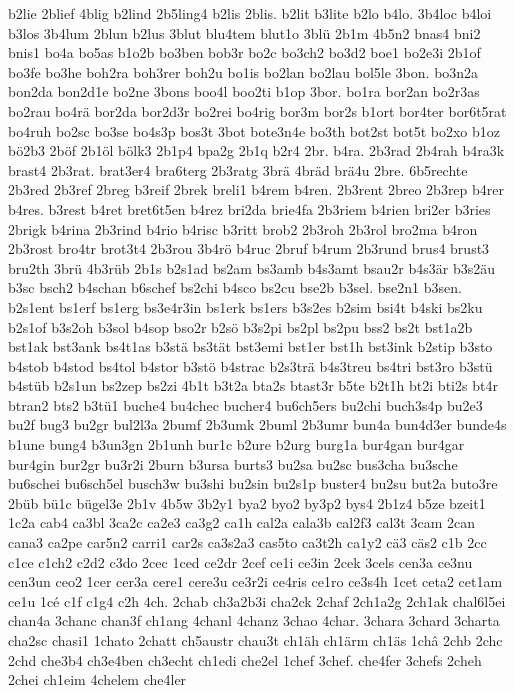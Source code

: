 {b2lie
2blief
4blig
b2lind
2b5ling4
b2lis
2blis.
b2lit
b3lite
b2lo
b4lo.
3b4loc
b4loi
b3los
3b4lum
2blun
b2lus
3blut
blu4tem
blut1o
3blü
2b1m
4b5n2
bnas4
bni2
bnis1
bo4a
bo5as
b1o2b
bo3ben
bob3r
bo2c
bo3ch2
bo3d2
boe1
bo2e3i
2b1of
bo3fe
bo3he
boh2ra
boh3rer
boh2u
bo1is
bo2lan
bo2lau
bol5le
3bon.
bo3n2a
bon2da
bon2d1e
bo2ne
3bons
boo4l
boo2ti
b1op
3bor.
bo1ra
bor2an
bo2r3as
bo2rau
bo4rä
bor2da
bor2d3r
bo2rei
bo4rig
bor3m
bor2s
b1ort
bor4ter
bor6t5rat
bo4ruh
bo2sc
bo3se
bo4s3p
bos3t
3bot
bote3n4e
bo3th
bot2st
bot5t
bo2xo
b1oz
bö2b3
2böf
2b1öl
bölk3
2b1p4
bpa2g
2b1q
b2r4
2br.
b4ra.
2b3rad
2b4rah
b4ra3k
brast4
2b3rat.
brat3er4
bra6terg
2b3ratg
3brä
4bräd
brä4u
2bre.
6b5rechte
2b3red
2b3ref
2breg
b3reif
2brek
breli1
b4rem
b4ren.
2b3rent
2breo
2b3rep
b4rer
b4res.
b3rest
b4ret
bret6t5en
b4rez
bri2da
brie4fa
2b3riem
b4rien
bri2er
b3ries
2brigk
b4rina
2b3rind
b4rio
b4risc
b3ritt
brob2
2b3roh
2b3rol
bro2ma
b4ron
2b3rost
bro4tr
brot3t4
2b3rou
3b4rö
b4ruc
2bruf
b4rum
2b3rund
brus4
brust3
bru2th
3brü
4b3rüb
2b1s
b2s1ad
bs2am
bs3amb
b4s3amt
bsau2r
b4s3är
b3s2äu
b3sc
bsch2
b4schan
b6schef
bs2chi
b4sco
bs2cu
bse2b
b3sel.
bse2n1
b3sen.
b2s1ent
bs1erf
bs1erg
bs3e4r3in
bs1erk
bs1ers
b3s2es
b2sim
bsi4t
b4ski
bs2ku
b2s1of
b3s2oh
b3sol
b4sop
bso2r
b2sö
b3s2pi
bs2pl
bs2pu
bss2
bs2t
bst1a2b
bst1ak
bst3ank
bs4t1as
b3stä
bs3tät
bst3emi
bst1er
bst1h
bst3ink
b2stip
b3sto
b4stob
b4stod
bs4tol
b4stor
b3stö
b4strac
b2s3trä
b4s3treu
bs4tri
bst3ro
b3stü
b4stüb
b2s1un
bs2zep
bs2zi
4b1t
b3t2a
bta2s
btast3r
b5te
b2t1h
bt2i
bti2s
bt4r
btran2
bts2
b3tü1
buche4
bu4chec
bucher4
bu6ch5ers
bu2chi
buch3s4p
bu2e3
bu2f
bug3
bu2gr
bul2l3a
2bumf
2b3umk
2buml
2b3umr
bun4a
bun4d3er
bunde4s
b1une
bung4
b3un3gn
2b1unh
bur1c
b2ure
b2urg
burg1a
bur4gan
bur4gar
bur4gin
bur2gr
bu3r2i
2burn
b3ursa
burts3
bu2sa
bu2sc
bus3cha
bu3sche
bu6schei
bu6sch5el
busch3w
bu3shi
bu2sin
bu2s1p
buster4
bu2su
but2a
buto3re
2büb
bü1c
bügel3e
2b1v
4b5w
3b2y1
bya2
byo2
by3p2
bys4
2b1z4
b5ze
bzeit1
1c2a
cab4
ca3bl
3ca2c
ca2e3
ca3g2
ca1h
cal2a
cala3b
cal2f3
cal3t
3cam
2can
cana3
ca2pe
car5n2
carri1
car2s
ca3s2a3
cas5to
ca3t2h
ca1y2
cä3
cäs2
c1b
2cc
c1ce
c1ch2
c2d2
c3do
2cec
1ced
ce2dr
2cef
ce1i
ce3in
2cek
3cels
cen3a
ce3nu
cen3un
ceo2
1cer
cer3a
cere1
cere3u
ce3r2i
ce4ris
ce1ro
ce3s4h
1cet
ceta2
cet1am
ce1u
1cé
c1f
c1g4
c2h
4ch.
2chab
ch3a2b3i
cha2ck
2chaf
2ch1a2g
2ch1ak
chal6l5ei
chan4a
3chanc
chan3f
ch1ang
4chanl
4chanz
3chao
4char.
3chara
3chard
3charta
cha2sc
chasi1
1chato
2chatt
ch5austr
chau3t
ch1äh
ch1ärm
ch1äs
1châ
2chb
2chc
2chd
che3b4
ch3e4ben
ch3echt
ch1edi
che2el
1chef
3chef.
che4fer
3chefs
2cheh
2chei
ch1eim
4chelem
che4ler
}
